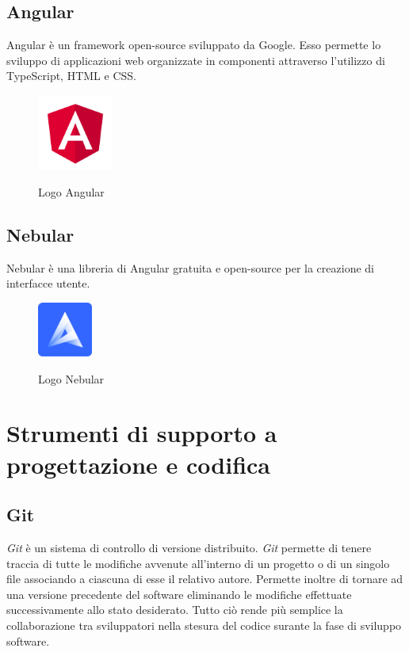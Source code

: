 	\subsection{Angular}
	Angular è un framework open-source sviluppato da Google. Esso permette lo sviluppo di applicazioni web organizzate in componenti attraverso l'utilizzo di TypeScript, \gls{HTML} e \gls{CSS}.
	
	\begin{figure}[H]
		\centering
		\includegraphics[width=2.5cm]{immagini/angular.png} \\
		\caption{\label{fig:logo_angular} Logo Angular}
	\end{figure}

	\subsection{Nebular}
	Nebular è una libreria di Angular gratuita e open-source per la creazione di interfacce utente.
	
	\begin{figure}[H]
		\centering
		\includegraphics[width=1.8cm]{immagini/nebular.png} \\
		\caption{\label{fig:logo_nebular} Logo Nebular}
	\end{figure}


\section{Strumenti di supporto a progettazione e codifica}
	\subsection{Git}
	\emph{Git} è un sistema di \gls{controllo di versione} distribuito. \emph{Git} permette di tenere traccia di tutte le modifiche avvenute all'interno di un progetto o di un singolo file associando a ciascuna di esse il relativo autore. Permette inoltre di tornare ad una versione precedente del software eliminando le modifiche effettuate successivamente allo stato desiderato. Tutto ciò rende più semplice la collaborazione tra sviluppatori nella stesura del codice surante la fase di sviluppo software.
	
